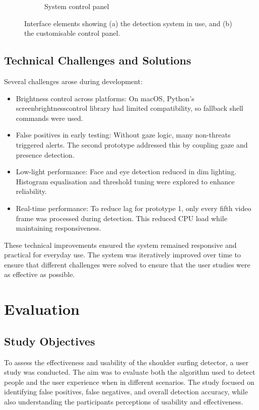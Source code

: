 \documentclass[12pt]{article}
\theoremstyle{plain}
\theoremstyle{definition}
\begin{document}
\begin{figure}[h!]
\begin{subfigure}[c]{0.45\textwidth}
    \caption{System control panel}
    \label{fig:gui_controls}
  \end{subfigure}
  \caption{Interface elements showing (a) the detection system in use, and (b) the customisable control panel.}
  \label{fig:gui_overview}
\end{figure}

\subsection{Technical Challenges and Solutions}
\label{challenges}

Several challenges arose during development:
\begin{itemize}
  \item Brightness control across platforms: On macOS, Python’s screen\textunderscore brightness\textunderscore control library had limited compatibility, so fallback shell commands were used.
  \item False positives in early testing: Without gaze logic, many non-threats triggered alerts. The second prototype addressed this by coupling gaze and presence detection.
  \item Low-light performance: Face and eye detection reduced in dim lighting. Histogram equalisation and threshold tuning were explored to enhance reliability.
  \item Real-time performance: To reduce lag for prototype 1, only every fifth video frame was processed during detection. This reduced CPU load while maintaining responsiveness.
\end{itemize}

These technical improvements ensured the system remained responsive and practical for everyday use. The system was iteratively improved over time to ensure that different challenges were solved to ensure that the user studies were as effective as possible.

\section{Evaluation}
\label{evaluation}

\subsection{Study Objectives}
\label{study_objectives}

To assess the effectiveness and usability of the shoulder surfing detector, a user study was conducted. The aim was to evaluate both the algorithm used to detect people and the user experience when in different scenarios. The study focused on identifying false positives, false negatives, and overall detection accuracy, while also understanding the participants perceptions of usability and effectiveness.
\end{document}
